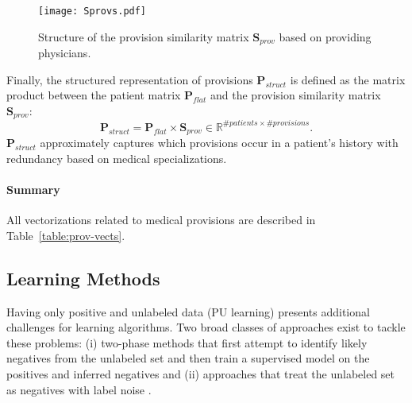 \begin{figure}[!h]
  \centering
  \texttt{[image: Sprovs.pdf]}
  \caption{Structure of the provision similarity matrix $\mathbf{S}_{prov}$ based on providing physicians.} 
  \label{fig:Sprovs}
\end{figure}

Finally, the structured representation of provisions $\mathbf{P}_{struct}$ is defined as the matrix product between the patient matrix $\mathbf{P}_{flat}$ and the provision similarity matrix $\mathbf{S}_{prov}$:
\begin{equation}
\mathbf{P}_{struct} = \mathbf{P}_{flat} \times \mathbf{S}_{prov} \in \mathbb{R}^{\# patients \times \# provisions}.
\end{equation}
$\mathbf{P}_{struct}$ approximately captures which provisions occur in a patient's history with redundancy based on medical specializations.

\paragraph{Summary} All vectorizations related to medical provisions are described in Table~\ref{table:prov-vects}.
\begin{table}[!h]
\centering
{}
\caption{Summary of vectorization schemes used for records of medical provisions.}
\label{table:prov-vects}
\end{table}


\subsection{Learning Methods} \label{learning-methods}
Having only positive and unlabeled data (PU learning) presents additional challenges for learning algorithms. Two broad classes of approaches exist to tackle these problems: (i) two-phase methods that first attempt to identify likely negatives from the unlabeled set and then train a supervised model on the positives and inferred negatives \citep{liu02partially, Yu:2005:SCM:1108759.1108762} and (ii) approaches that treat the unlabeled set as negatives with label noise \citep{Elkan:2008:LCO:1401890.1401920,Lee03learningwith,MORDELET-2010-523336,Claesen2015resvm}. 

